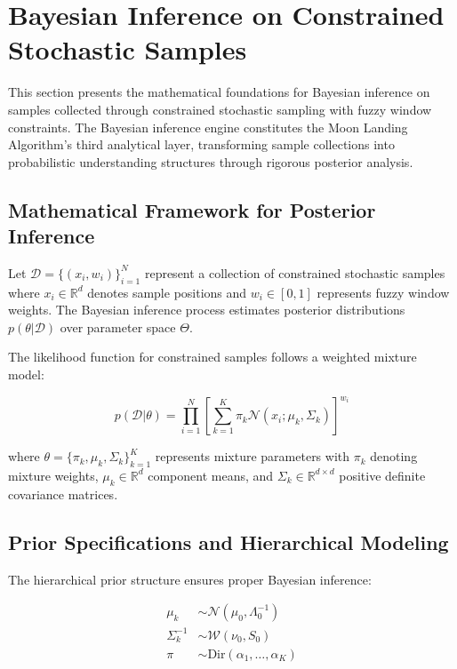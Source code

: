 \section{Bayesian Inference on Constrained Stochastic Samples}
\label{sec:bayesian-inference}

This section presents the mathematical foundations for Bayesian inference on samples collected through constrained stochastic sampling with fuzzy window constraints. The Bayesian inference engine constitutes the Moon Landing Algorithm's third analytical layer, transforming sample collections into probabilistic understanding structures through rigorous posterior analysis.

\subsection{Mathematical Framework for Posterior Inference}

\begin{definition}
Let $\mathcal{D} = \{(x_i, w_i)\}_{i=1}^N$ represent a collection of constrained stochastic samples where $x_i \in \mathbb{R}^d$ denotes sample positions and $w_i \in [0,1]$ represents fuzzy window weights. The Bayesian inference process estimates posterior distributions $p(\theta|\mathcal{D})$ over parameter space $\Theta$.
\end{definition}

The likelihood function for constrained samples follows a weighted mixture model:

\begin{equation}
p(\mathcal{D}|\theta) = \prod_{i=1}^N \left[ \sum_{k=1}^K \pi_k \mathcal{N}(x_i; \mu_k, \Sigma_k) \right]^{w_i}
\label{eq:constrained-likelihood}
\end{equation}

where $\theta = \{\pi_k, \mu_k, \Sigma_k\}_{k=1}^K$ represents mixture parameters with $\pi_k$ denoting mixture weights, $\mu_k \in \mathbb{R}^d$ component means, and $\Sigma_k \in \mathbb{R}^{d \times d}$ positive definite covariance matrices.

\subsection{Prior Specifications and Hierarchical Modeling}

The hierarchical prior structure ensures proper Bayesian inference:

\begin{align}
\mu_k &\sim \mathcal{N}(\mu_0, \Lambda_0^{-1}) \label{eq:mean-prior}\\
\Sigma_k^{-1} &\sim \mathcal{W}(\nu_0, S_0) \label{eq:precision-prior}\\
\pi &\sim \text{Dir}(\alpha_1, \ldots, \alpha_K) \label{eq:mixture-prior}
\end{align}

